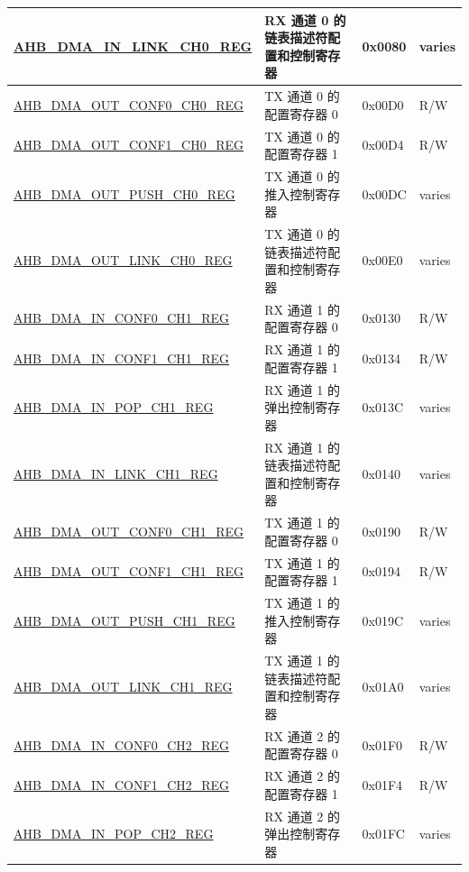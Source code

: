 \begin{longtable}{ | p{8cm} | p{8cm} | p{1.3cm} | p{1.5cm} | }
\hyperref[regdesc:AHBDMAINLINKCHNREG]{AHB\_DMA\_IN\_LINK\_CH0\_REG} & RX 通道 0 的链表描述符配置和控制寄存器 & 0x0080 & varies \\ \hline
\hyperref[regdesc:AHBDMAOUTCONF0CHNREG]{AHB\_DMA\_OUT\_CONF0\_CH0\_REG} & TX 通道 0 的配置寄存器 0 & 0x00D0 & R/W \\ \hline
\hyperref[regdesc:AHBDMAOUTCONF1CHNREG]{AHB\_DMA\_OUT\_CONF1\_CH0\_REG} & TX 通道 0 的配置寄存器 1 & 0x00D4 & R/W \\ \hline
\hyperref[regdesc:AHBDMAOUTPUSHCHNREG]{AHB\_DMA\_OUT\_PUSH\_CH0\_REG} & TX 通道 0 的推入控制寄存器 & 0x00DC & varies \\ \hline
\hyperref[regdesc:AHBDMAOUTLINKCHNREG]{AHB\_DMA\_OUT\_LINK\_CH0\_REG} & TX 通道 0 的链表描述符配置和控制寄存器 & 0x00E0 & varies \\ \hline
\hyperref[regdesc:AHBDMAINCONF0CHNREG]{AHB\_DMA\_IN\_CONF0\_CH1\_REG} & RX 通道 1 的配置寄存器 0 & 0x0130 & R/W \\ \hline
\hyperref[regdesc:AHBDMAINCONF1CHNREG]{AHB\_DMA\_IN\_CONF1\_CH1\_REG} & RX 通道 1 的配置寄存器 1 & 0x0134 & R/W \\ \hline
\hyperref[regdesc:AHBDMAINPOPCHNREG]{AHB\_DMA\_IN\_POP\_CH1\_REG} & RX 通道 1 的弹出控制寄存器 & 0x013C & varies \\ \hline
\hyperref[regdesc:AHBDMAINLINKCHNREG]{AHB\_DMA\_IN\_LINK\_CH1\_REG} & RX 通道 1 的链表描述符配置和控制寄存器 & 0x0140 & varies \\ \hline
\hyperref[regdesc:AHBDMAOUTCONF0CHNREG]{AHB\_DMA\_OUT\_CONF0\_CH1\_REG} & TX 通道 1 的配置寄存器 0 & 0x0190 & R/W \\ \hline
\hyperref[regdesc:AHBDMAOUTCONF1CHNREG]{AHB\_DMA\_OUT\_CONF1\_CH1\_REG} & TX 通道 1 的配置寄存器 1 & 0x0194 & R/W \\ \hline
\hyperref[regdesc:AHBDMAOUTPUSHCHNREG]{AHB\_DMA\_OUT\_PUSH\_CH1\_REG} & TX 通道 1 的推入控制寄存器 & 0x019C & varies \\ \hline
\hyperref[regdesc:AHBDMAOUTLINKCHNREG]{AHB\_DMA\_OUT\_LINK\_CH1\_REG} & TX 通道 1 的链表描述符配置和控制寄存器 & 0x01A0 & varies \\ \hline
\hyperref[regdesc:AHBDMAINCONF0CHNREG]{AHB\_DMA\_IN\_CONF0\_CH2\_REG} & RX 通道 2 的配置寄存器 0 & 0x01F0 & R/W \\ \hline
\hyperref[regdesc:AHBDMAINCONF1CHNREG]{AHB\_DMA\_IN\_CONF1\_CH2\_REG} & RX 通道 2 的配置寄存器 1 & 0x01F4 & R/W \\ \hline
\hyperref[regdesc:AHBDMAINPOPCHNREG]{AHB\_DMA\_IN\_POP\_CH2\_REG} & RX 通道 2 的弹出控制寄存器 & 0x01FC & varies \\ \hline

\end{longtable}
